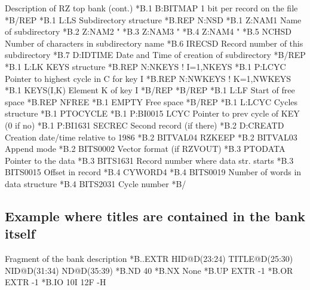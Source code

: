 \begin{XMPt}{Description of RZ top bank (cont.)}
*B.1     B:BITMAP      1 bit per record on the file                       
*B/REP
*B.1     L:LS          Subdirectory  structure
*B.REP               N:NSD            
*B.1     Z:NAM1        Name of subdirectory                   
*B.2     Z:NAM2        "                                          
*B.3     Z:NAM3        "                                          
*B.4     Z:NAM4        "                                          
*B.5     NCHSD         Number of characters in subdirectory name  
*B.6     IRECSD        Record number of this subdirectory         
*B.7     D:IDTIME      Date and Time of creation of subdirectory  
*B/REP
*B.1     L:LK          KEYS structure
*B.REP               N:NKEYS        ! I=1,NKEYS   
*B.1     P:LCYC        Pointer to highest cycle in C for key I
*B.REP               N:NWKEYS       ! K=1,NWKEYS 
*B.1     KEYS(I,K)     Element K of key I                     
*B/REP
*B/REP
*B.1     L:LF          Start of free space
*B.REP   NFREE
*B.1     EMPTY         Free space
*B/REP
*B.1     L:LCYC        Cycles structure
*B.1     PTOCYCLE       
*B.1     P:BI0015      LCYC Pointer to prev cycle of KEY (0 if no)
*B.1     P:BI1631      SECREC Second record (if there)
*B.2     D:CREATD      Creation date/time relative to 1986
*B.2     BITVAL04      RZKEEP
*B.2     BITVAL03      Append mode
*B.2     BITS0002      Vector format (if RZVOUT)
*B.3     PTODATA       Pointer to the data
*B.3     BITS1631      Record number where data str. starts
*B.3     BITS0015      Offset in record
*B.4     CYWORD4       
*B.4     BITS0019      Number of words in data structure
*B.4     BITS2031      Cycle number
*B/
\end{XMPt} 
 
\subsection{Example where titles are contained in the bank itself}
\begin{XMPt}{Fragment of the bank description}
*B..EXTR HID@D(23:24) TITLE@D(25:30) NID@D(31:34) ND@D(35:39)
*B.ND    40
*B.NX    None
*B.UP    EXTR -1
*B.OR    EXTR -1
*B.IO    10I 12F -H
\end{XMPt} 
 
